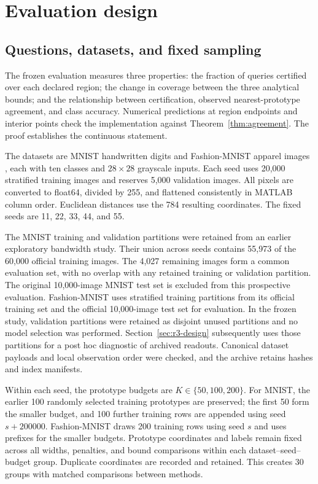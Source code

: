 \documentclass[preprint,12pt,authoryear]{elsarticle}
\begin{document}


\section{Evaluation design}
\subsection{Questions, datasets, and fixed sampling}
The frozen evaluation measures three properties: the fraction of queries certified over each declared region; the change in coverage between the three analytical bounds; and the relationship between certification, observed nearest-prototype agreement, and class accuracy. Numerical predictions at region endpoints and interior points check the implementation against Theorem~\ref{thm:agreement}. The proof establishes the continuous statement.

The datasets are MNIST handwritten digits \citep{lecun1998} and Fashion-MNIST apparel images \citep{xiao2017fashion}, each with ten classes and $28\times28$ grayscale inputs. Each seed uses 20,000 stratified training images and reserves 5,000 validation images. All pixels are converted to float64, divided by 255, and flattened consistently in MATLAB column order. Euclidean distances use the 784 resulting coordinates. The fixed seeds are 11, 22, 33, 44, and 55.

The MNIST training and validation partitions were retained from an earlier exploratory bandwidth study. Their union across seeds contains 55,973 of the 60,000 official training images. The 4,027 remaining images form a common evaluation set, with no overlap with any retained training or validation partition. The original 10,000-image MNIST test set is excluded from this prospective evaluation. Fashion-MNIST uses stratified training partitions from its official training set and the official 10,000-image test set for evaluation. In the frozen study, validation partitions were retained as disjoint unused partitions and no model selection was performed. Section~\ref{sec:r3-design} subsequently uses those partitions for a post hoc diagnostic of archived readouts. Canonical dataset payloads and local observation order were checked, and the archive retains hashes and index manifests.

Within each seed, the prototype budgets are $K\in\{50,100,200\}$. For MNIST, the earlier 100 randomly selected training prototypes are preserved; the first 50 form the smaller budget, and 100 further training rows are appended using seed $s+200000$. Fashion-MNIST draws 200 training rows using seed $s$ and uses prefixes for the smaller budgets. Prototype coordinates and labels remain fixed across all widths, penalties, and bound comparisons within each dataset--seed--budget group. Duplicate coordinates are recorded and retained. This creates 30 groups with matched comparisons between methods.
\end{document}

